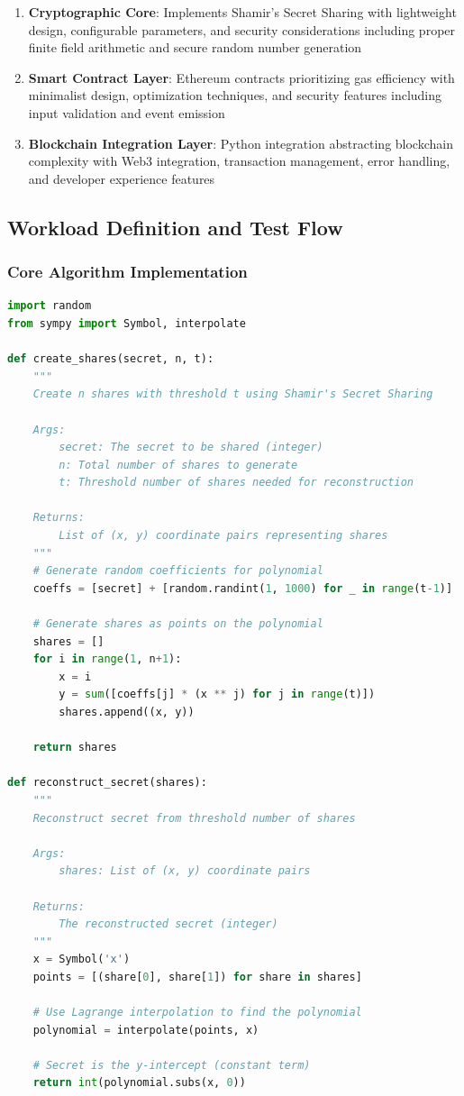 \documentclass[12pt,a4paper]{article}
\begin{document}
\begin{enumerate}[leftmargin=15pt]
    \item \textbf{Cryptographic Core}: Implements Shamir's Secret Sharing with lightweight design, configurable parameters, and security considerations including proper finite field arithmetic and secure random number generation
    \item \textbf{Smart Contract Layer}: Ethereum contracts prioritizing gas efficiency with minimalist design, optimization techniques, and security features including input validation and event emission
    \item \textbf{Blockchain Integration Layer}: Python integration abstracting blockchain complexity with Web3 integration, transaction management, error handling, and developer experience features
\end{enumerate}
\subsection{Workload Definition and Test Flow}

\subsubsection{Core Algorithm Implementation}

\begin{lstlisting}[language=Python, caption=Core Secret Sharing Implementation, label=lst:core_implementation]
import random
from sympy import Symbol, interpolate

def create_shares(secret, n, t):
    """
    Create n shares with threshold t using Shamir's Secret Sharing
    
    Args:
        secret: The secret to be shared (integer)
        n: Total number of shares to generate
        t: Threshold number of shares needed for reconstruction
    
    Returns:
        List of (x, y) coordinate pairs representing shares
    """
    # Generate random coefficients for polynomial
    coeffs = [secret] + [random.randint(1, 1000) for _ in range(t-1)]
    
    # Generate shares as points on the polynomial
    shares = []
    for i in range(1, n+1):
        x = i
        y = sum([coeffs[j] * (x ** j) for j in range(t)])
        shares.append((x, y))
    
    return shares

def reconstruct_secret(shares):
    """
    Reconstruct secret from threshold number of shares
    
    Args:
        shares: List of (x, y) coordinate pairs
        
    Returns:
        The reconstructed secret (integer)
    """
    x = Symbol('x')
    points = [(share[0], share[1]) for share in shares]
    
    # Use Lagrange interpolation to find the polynomial
    polynomial = interpolate(points, x)
    
    # Secret is the y-intercept (constant term)
    return int(polynomial.subs(x, 0))
\end{lstlisting}
\end{document}
